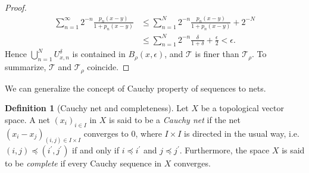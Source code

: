 \documentclass{article}
\numberwithin{equation}{section}
\renewcommand{\cal}{\mathcal}
\theoremstyle{plain}
\theoremstyle{definition}
\newtheorem{definition}[theorem]{Definition}
\begin{document}
\begin{proof}
\begin{align*}
	\sum_{n=1}^\infty 2^{-n}\frac{p_n(x-y)}{1+p_n(x-y)}&\leq	\sum_{n=1}^N 2^{-n}\frac{p_n(x-y)}{1+p_n(x-y)}+2^{-N}\\
	&\leq\sum_{n=1}^N2^{-n}\frac{\delta}{1+\delta}+\frac{\epsilon}{2}<\epsilon.
\end{align*}
Hence $\bigcup_{n=1}^NU_{x,n}^{\delta}$ is contained in $B_\rho(x,\epsilon)$, and $\cal{T}$ is finer than $\cal{T}_\rho$. To summarize, $\cal{T}$ and $\cal{T}_\rho$ coincide.
\end{proof}

We can generalize the concept of Cauchy property of sequences to nets.
\begin{definition}[Cauchy net and completeness]
Let $X$ be a topological vector space. A net $(x_i)_{i\in I}$ in $X$ is said to be a \textit{Cauchy net} if the net $(x_i-x_j)_{(i,j)\in I\times I}$ converges to $0$, where $I\times I$ is directed in the usual way, i.e. $(i,j)\preceq(i^\prime,j^\prime)$ if and only if $i\preceq i^\prime$ and $j\preceq j^\prime$. Furthermore, the space $X$ is said to be \textit{complete} if every Cauchy sequence in $X$ converges.
\end{definition}
\end{document}
